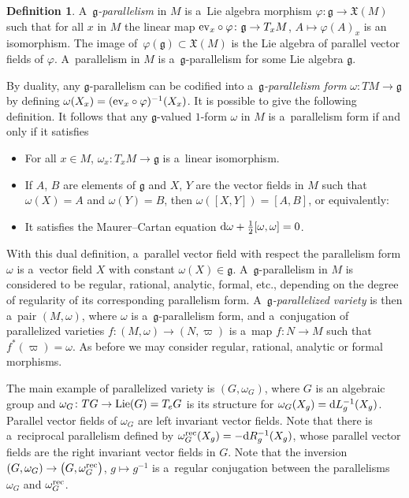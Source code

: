 \documentclass[pdftex]{sigma}
\numberwithin{equation}{section}
\theoremstyle{definition}
\newtheorem{Definition}[Theorem]{Definition}
\begin{document}
\begin{Definition} A~\emph{$\mathfrak g$-parallelism} in $M$ is a~Lie algebra morphism $\varphi\colon \mathfrak g \to \mathfrak X(M)$ such that for all $x$ in $M$ the linear map ${\rm ev}_x\circ \varphi\colon \mathfrak g \to T_xM$, $A\mapsto \varphi(A)_x$ is an isomorphism.
The image of~${\varphi(\mathfrak g) \subset \mathfrak X(M)}$ is the Lie algebra of parallel vector fields of $\varphi$. A~parallelism in $M$ is a~$\mathfrak g$-parallelism for some Lie algebra $\mathfrak g$.
\end{Definition}

By duality, any $\mathfrak g$-parallelism can be codified into a~\emph{$\mathfrak g$-parallelism form} $\omega\colon TM\to \mathfrak g$ by defining $\omega(X_x) = ({\rm ev}_x\circ \varphi)^{-1}(X_x)$. It is possible to give the following definition. It follows that any $\mathfrak g$-valued $1$-form $\omega$ in $M$ is a~parallelism form if and only if it satisfies
\begin{itemize}\itemsep=0pt
 \item[(1)] For all $x\in M$, $\omega_x\colon T_xM \to \mathfrak g$ is a~linear isomorphism.
 \item[(2)] If $A$, $B$ are elements of $\mathfrak g$ and $X$, $Y$ are the vector fields in $M$ such that $\omega(X) =A$ and $\omega(Y) = B$, then $\omega([X,Y]) = [A,B]$, or equivalently:
 \item[(2')] It satisfies the Maurer--Cartan equation ${\rm d}\omega + \frac{1}{2}[\omega,\omega] = 0$.
\end{itemize}

With this dual definition, a~parallel vector field with respect the parallelism form $\omega$ is a~vector field $X$ with constant $\omega(X)\in \mathfrak g$. A~$\mathfrak g$-parallelism in $M$ is considered to be regular, rational, analytic, formal, etc., depending on the degree of regularity of its corresponding parallelism form. A~\emph{$\mathfrak g$-parallelized variety} is then a~pair $(M,\omega)$, where $\omega$ is a~$\mathfrak g$-parallelism form, and a~conjugation of parallelized varieties $f\colon (M,\omega)\to (N,\varpi)$ is a~map $f\colon N\to M$ such that $f^*(\varpi) = \omega$. As before we may consider regular, rational, analytic or formal morphisms.

The main example of parallelized variety is $(G, \omega_G)$, where $G$ is an algebraic group and $\omega_G\colon TG\to {\rm Lie}(G) = T_eG$ is its structure for $\omega_G(X_g) = {\rm d}L_g^{-1}(X_g)$. Parallel vector fields of $\omega_G$ are left invariant vector fields. Note that there is a~reciprocal parallelism defined by ${\omega_G^{\rm rec}(X_g) = - {\rm d}R_{g}^{-1}(X_g)}$, whose parallel vector fields are the right invariant vector fields in $G$. Note that the inversion $(G,\omega_G) \to \bigl(G,\omega_G^{\rm rec}\bigr)$, $g\mapsto g^{-1}$ is a~regular conjugation between the parallelisms $\omega_G$ and $\omega_G^{\rm rec}$.
\end{document}
